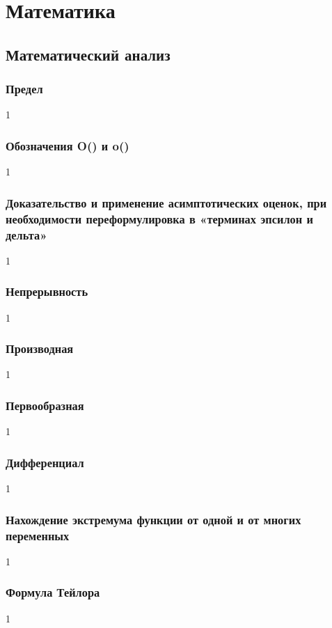 \documentclass[12pt]{matmex-diploma}
\begin{document}
\tableofcontents

\section{Математика} 


    \subsection{Математический анализ}

        \subsubsection*{Предел}
            1
        \subsubsection*{Обозначения O() и o()}
            1
        \subsubsection*{Доказательство и применение асимптотических оценок, при необходимости переформулировка в «терминах эпсилон и дельта»}
            1
        \subsubsection*{Непрерывность}
            1
        \subsubsection*{Производная}
            1
        \subsubsection*{Первообразная}
            1
        \subsubsection*{Дифференциал}
            1
        \subsubsection*{Нахождение экстремума функции от одной и от многих переменных}
            1
        \subsubsection*{Формула Тейлора}
            1
        
\end{document}
